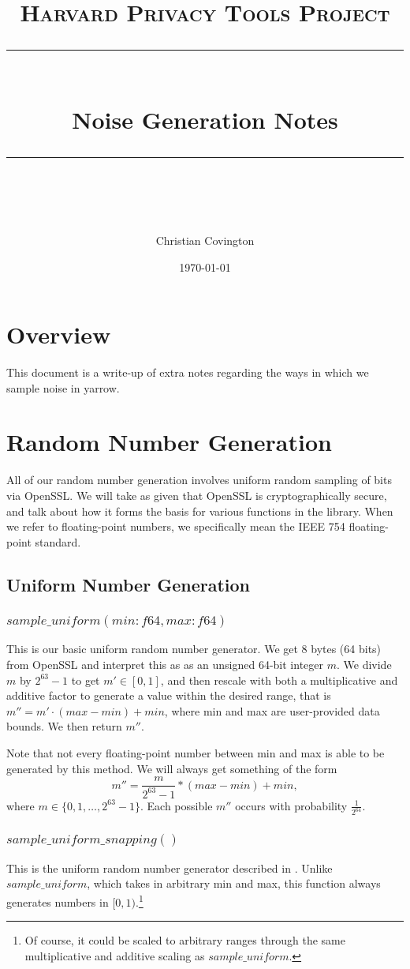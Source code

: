 \documentclass[11pt]{scrartcl} %
\title{
	\normalfont\normalsize
	\textsc{Harvard Privacy Tools Project}\\ %
	\vspace{25pt} %
	\rule{\linewidth}{0.5pt}\\ %
	\vspace{20pt} %
	{\huge Noise Generation Notes}\\ %
	\vspace{12pt} %
	\rule{\linewidth}{2pt}\\ %
	\vspace{12pt} %
}
\author{\LARGE Christian Covington} %
\date{\normalsize\today} %
\begin{document}
\maketitle

\section{Overview}
This document is a write-up of extra notes regarding the ways in which we sample noise in yarrow.

\section{Random Number Generation}
All of our random number generation involves uniform random sampling of bits via OpenSSL.
We will take as given that OpenSSL is cryptographically secure, and talk about how it
forms the basis for various functions in the library.
When we refer to floating-point numbers, we specifically mean the IEEE 754 floating-point standard.

\subsection{Uniform Number Generation}

\subsubsection{$sample\_uniform(min: f64, max: f64)$}
This is our basic uniform random number generator. We get 8 bytes (64 bits) from OpenSSL and interpret
this as as an unsigned 64-bit integer $m$. We divide $m$ by $2^{63}-1$ to get $m' \in [0,1]$, and then
rescale with both a multiplicative and additive factor to generate a value within the desired range,
that is $m'' = m' \cdot (max - min) + min$, where min and max are user-provided data bounds.
We then return $m''$. \newline

Note that not every floating-point number between min and max is able to
be generated by this method. We will always get something of the form
\[ m'' = \frac{m}{2^{63}-1} * (max - min) + min, \]
where $m \in \{0, 1, \hdots, 2^{63}-1\}$. Each possible $m''$ occurs with probability $\frac{1}{2^{64}}$.

\subsubsection{$sample\_uniform\_snapping()$}
This is the uniform random number generator described in \cite{Mir12}.
Unlike $sample\_uniform$, which takes in arbitrary min and max, this function
always generates numbers in $[0,1)$.\footnote{Of course, it could be scaled to arbitrary ranges through the same
multiplicative and additive scaling as $sample\_uniform$.} \newline
\end{document}

